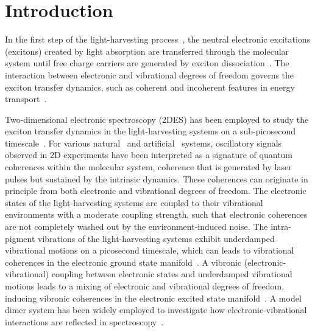 \documentclass[%
 reprint,%
 amssymb, amsmath,%
 aip,cha,%
]{revtex4-1}
\begin{document}
\maketitle


\section{Introduction}

In the first step of the light-harvesting process~\cite{Amerogen2000,Blankenship2002}, the neutral electronic excitations (excitons) created by light absorption are transferred through the molecular system until free charge carriers are generated by exciton dissociation~\cite{Amerogen2000,Blankenship2002}. The interaction between electronic and vibrational degrees of freedom governs the exciton transfer dynamics, such as coherent and incoherent features in energy transport~\cite{IshizakiPCCP2010,HuelgaCP2013,ChenuARPC2015}.

Two-dimensional electronic spectroscopy (2DES) has been employed to study the exciton transfer dynamics in the light-harvesting systems on a sub-picosecond timescale~\cite{JonasARPC2003}. For various natural~\cite{Engel2007,Collini2010,CaramJCP2012,FidlerJPCA2012,RomeroNP2014,Fuller2014} and artificial~\cite{MilotaJPCA2013,HayesScience2013,HalpinNC2014,SongNC2014,LimNC2015,CassetteNC2015,BolzonelloJPCL2016,SioArxiv2016} systems, oscillatory signals observed in 2D experiments have been interpreted as a signature of quantum coherences within the molecular system, coherence that is generated by laser pulses but sustained by the intrinsic dynamics. These coherences can originate in principle from both electronic and vibrational degrees of freedom. The electronic states of the light-harvesting systems are coupled to their vibrational environments with a moderate coupling strength, such that electronic coherences are not completely washed out by the environment-induced noise. The intra-pigment vibrations of the light-harvesting systems exhibit underdamped vibrational motions on a picosecond timescale, which can leads to vibrational coherences in the electronic ground state manifold~\cite{ButkusCPL2012,TiwariPNAS2013}. A vibronic (electronic-vibrational) coupling between electronic states and underdamped vibrational motions leads to a mixing of electronic and vibrational degrees of freedom, inducing vibronic coherences in the electronic excited state manifold~\cite{PriorPRL2010,ChinNJP2010,ChristenssonJPCB2012,ChinNP2013,TiwariPNAS2013,PlenioJCP2013,ChenuSR2013,ButkusJCP2014,BasinskaitePR2014}. A model dimer system has been widely employed to investigate how electronic-vibrational interactions are reflected in spectroscopy~\cite{PlenioJCP2013,ChenuSR2013,ButkusJCP2014,BasinskaitePR2014,YangJMS2006,PolyutovCP2012,SchroterPR2015}.
\end{document}
